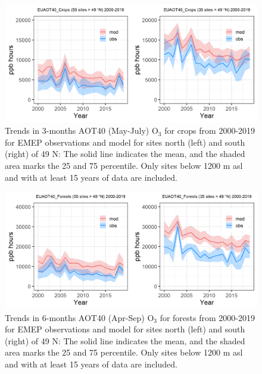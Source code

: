\begin{figure}[h]
	\centering
	\includegraphics[width=0.74\paperwidth]{FIGS_TRENDS/EUAOT40_Crops_2000_2019_1200m.png}
	\caption{\label{fig:O3_aot40croptrends} Trends in 3-months AOT40 (May-July) O$_3$ for crops from 2000-2019 for EMEP observations and model for sites north (left) and south (right) of 49 N: The solid line indicates the mean, and the shaded area marks the 25 and 75 percentile. Only sites below 1200 m asl and with at least 15 years of data are included.}
\end{figure}

\begin{figure}[h]
	\centering
	\includegraphics[width=0.74\paperwidth]{FIGS_TRENDS/EUAOT40_Forests_2000_2019_1200m.png}
	\caption{\label{fig:O3_aot40foresttrends}Trends in 6-months AOT40 (Apr-Sep) O$_3$ for forests from 2000-2019 for EMEP observations and model for sites north (left) and south (right) of 49 N: The solid line indicates the mean, and the shaded area marks the 25 and 75 percentile. Only sites below 1200 m asl and with at least 15 years of data are included.}
\end{figure}

